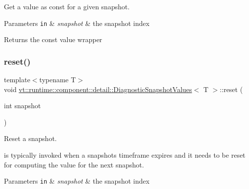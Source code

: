 Get a value as const for a given snapshot. 


\begin{DoxyParams}[1]{Parameters}
\mbox{\tt in}  & {\em snapshot} & the snapshot index\\
\hline
\end{DoxyParams}
\begin{DoxyReturn}{Returns}
the const value wrapper 
\end{DoxyReturn}
\mbox{\label{structvt_1_1runtime_1_1component_1_1detail_1_1_diagnostic_snapshot_values_ac8bd81d164c5928dfd4213ddfd0d0206}} 
\subsubsection{\texorpdfstring{reset()}{reset()}}
{\footnotesize\ttfamily template$<$typename T$>$ \\
void \hyperlink{structvt_1_1runtime_1_1component_1_1detail_1_1_diagnostic_snapshot_values}{vt\+::runtime\+::component\+::detail\+::\+Diagnostic\+Snapshot\+Values}$<$ T $>$\+::reset (\begin{DoxyParamCaption}\item[{int}]{snapshot }\end{DoxyParamCaption})\hspace{0.3cm}{\ttfamily [inline]}}



Reset a snapshot. 

is typically invoked when a snapshot\textquotesingle{}s timeframe expires and it needs to be reset for computing the value for the next snapshot.


\begin{DoxyParams}[1]{Parameters}
\mbox{\tt in}  & {\em snapshot} & the snapshot index \\
\hline
\end{DoxyParams}
\mbox{\label{structvt_1_1runtime_1_1component_1_1detail_1_1_diagnostic_snapshot_values_a7aafbfe1b3ce5dd2351d504a60512691}} 
